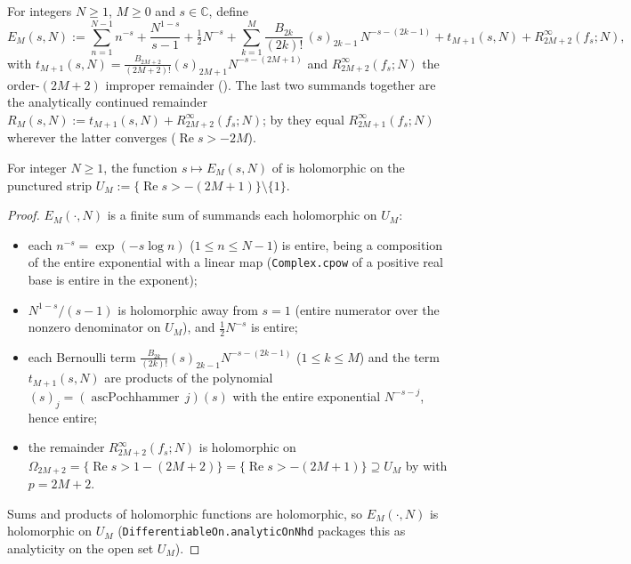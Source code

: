 \begin{definition}
\label{def:zeta_em_rhs}
\leanok
{}
For integers $N \ge 1$, $M \ge 0$ and $s \in \mathbb{C}$, define
\[
  E_M(s,N) := \sum_{n=1}^{N-1} n^{-s} + \frac{N^{1-s}}{s-1} + \tfrac12 N^{-s}
    + \sum_{k=1}^{M} \frac{B_{2k}}{(2k)!}\,(s)_{2k-1}\,N^{-s-(2k-1)}
    + t_{M+1}(s,N) + R^{\infty}_{2M+2}(f_s; N),
\]
with $t_{M+1}(s,N) = \frac{B_{2M+2}}{(2M+2)!}(s)_{2M+1}N^{-s-(2M+1)}$ and
$R^{\infty}_{2M+2}(f_s;N)$ the order-$(2M+2)$ improper remainder
(). The last two summands together are the analytically continued
remainder $R_M(s,N) := t_{M+1}(s,N) + R^{\infty}_{2M+2}(f_s;N)$; by  they
equal $R^{\infty}_{2M+1}(f_s;N)$ wherever the latter converges
($\operatorname{Re} s > -2M$).
\end{definition}

\begin{lemma}
\label{lem:zeta_em_analytic}
\leanok
{}
For integer $N \ge 1$, the function $s \mapsto E_M(s,N)$ of  is
holomorphic on the punctured strip
$U_M := \{\operatorname{Re} s > -(2M+1)\}\setminus\{1\}$.
\end{lemma}

\begin{proof}
\leanok
{}
$E_M(\cdot,N)$ is a finite sum of summands each holomorphic on $U_M$:
\begin{itemize}
\item each $n^{-s} = \exp(-s\log n)$ ($1 \le n \le N-1$) is entire, being a composition of
  the entire exponential with a linear map (\texttt{Complex.cpow} of a positive real base is
  entire in the exponent);
\item $N^{1-s}/(s-1)$ is holomorphic away from $s = 1$ (entire numerator over the nonzero
  denominator on $U_M$), and $\tfrac12 N^{-s}$ is entire;
\item each Bernoulli term $\frac{B_{2k}}{(2k)!}(s)_{2k-1}N^{-s-(2k-1)}$ ($1 \le k \le M$) and
  the term $t_{M+1}(s,N)$ are products of the polynomial $(s)_{j} = (\operatorname{ascPochhammer}\,j)(s)$
  with the entire exponential $N^{-s-j}$, hence entire;
\item the remainder $R^{\infty}_{2M+2}(f_s;N)$ is holomorphic on
  $\Omega_{2M+2} = \{\operatorname{Re} s > 1 - (2M+2)\} = \{\operatorname{Re} s > -(2M+1)\}
  \supseteq U_M$ by  with $p = 2M+2$.
\end{itemize}
Sums and products of holomorphic functions are holomorphic, so $E_M(\cdot,N)$ is holomorphic
on $U_M$ (\texttt{DifferentiableOn.analyticOnNhd} packages this as analyticity on the open
set $U_M$).
\end{proof}

